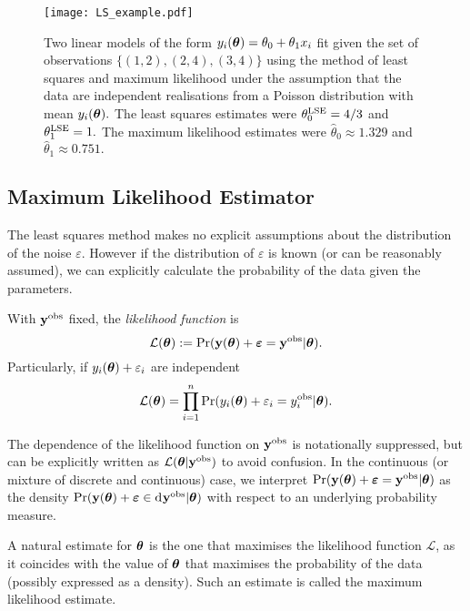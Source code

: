 \begin{figure}[htbp]
    \centering
    \texttt{[image: LS\_example.pdf]}
    \caption{
        Two linear models of the form
        $y_i(\bm{\theta}) = \theta_0 + \theta_1x_i$ fit given the set
        of observations $\{(1, 2), (2, 4), (3, 4)\}$ using the method of
        least squares and maximum likelihood under
        the assumption that the data are independent realisations from a Poisson
        distribution with mean $y_i(\bm{\theta}).$ The least squares estimates
        were $\theta^{\mathrm{LSE}}_0 = 4/3$ and $\theta^{\mathrm{LSE}}_1 = 1.$ The maximum likelihood
        estimates were $\hat{\theta}_0 \approx 1.329$ and
        $\hat{\theta}_1 \approx 0.751.$
    }
    \label{fig:LSE}
\end{figure}

\subsection*{Maximum Likelihood Estimator}

The least squares method makes no explicit assumptions about the distribution
of the noise $\varepsilon.$ However if the distribution of $\varepsilon$ is
known (or can be reasonably assumed), we can
explicitly calculate the probability of the data given the parameters.

\begin{definition}
    With $\mathbf{y}^{\mathrm{obs}}$ fixed, the \emph{likelihood function} is
    $$
        \mathcal{L}(\bm{\theta})
        := \Pr(
        \mathbf{y}(\bm{\theta}) + \bm{\varepsilon} = \mathbf{y}^{\mathrm{obs}}
        | \bm{\theta}
        ).
    $$
    Particularly, if $y_i(\bm{\theta}) + \varepsilon_i$ are independent
    $$
        \mathcal{L}(\bm{\theta})
        = \prod_{i = 1}^n
        \Pr(
        y_i(\bm{\theta}) + \varepsilon_i = y_i^{\mathrm{obs}}
        | \bm{\theta}
        ).
    $$
\end{definition}

The dependence of the likelihood function on $\mathbf{y}^{\mathrm{obs}}$ is notationally
suppressed, but can be
explicitly written as $\mathcal{L}(\bm{\theta}|\mathbf{y}^{\mathrm{obs}})$ to avoid confusion.
In the continuous
(or mixture of discrete and continuous) case,
we interpret
$
    \Pr(
    \mathbf{y}(\bm{\theta}) + \bm{\varepsilon} = \mathbf{y}^{\mathrm{obs}}
    | \bm{\theta}
    )
$
as the density
$
    \Pr(
    \by(\btheta) + \bm{\varepsilon} \in \diff\by^\obs
    | \btheta
    )
$ with respect to an underlying probability measure.

A natural estimate for $\bm{\theta}$ is the one that maximises the likelihood
function $\mathcal{L}$, as it coincides with the value of $\bm{\theta}$
that maximises the
probability of the data (possibly expressed as a density).
Such an estimate is called the maximum likelihood
estimate.

